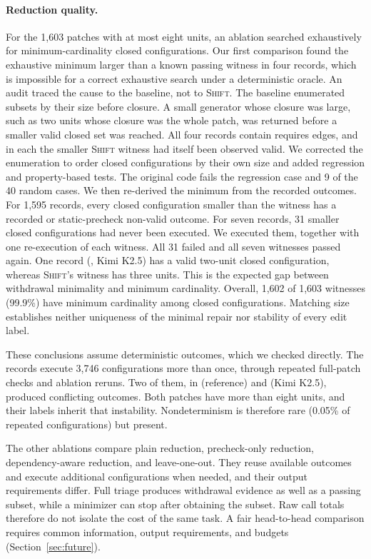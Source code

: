 \documentclass[a4paper,fleqn]{cas-sc}
\newcommand{\tool}{\textsc{Shift}}
\newcommand{\code}[1]{\texttt{\detokenize{#1}}}
\begin{document}
\paragraph{Reduction quality.}
For the 1,603 patches with at most eight units, an ablation searched exhaustively for minimum-cardinality closed configurations. Our first comparison found the exhaustive minimum larger than a known passing witness in four records, which is impossible for a correct exhaustive search under a deterministic oracle. An audit traced the cause to the baseline, not to \tool{}. The baseline enumerated subsets by their size before closure. A small generator whose closure was large, such as two units whose closure was the whole patch, was returned before a smaller valid closed set was reached. All four records contain requires edges, and in each the smaller \tool{} witness had itself been observed valid. We corrected the enumeration to order closed configurations by their own size and added regression and property-based tests. The original code fails the regression case and 9 of the 40 random cases. We then re-derived the minimum from the recorded outcomes. For 1,595 records, every closed configuration smaller than the witness has a recorded or static-precheck non-valid outcome. For seven records, 31 smaller closed configurations had never been executed. We executed them, together with one re-execution of each witness. All 31 failed and all seven witnesses passed again. One record (\code{sympy__sympy-19783}, Kimi K2.5) has a valid two-unit closed configuration, whereas \tool{}'s witness has three units. This is the expected gap between withdrawal minimality and minimum cardinality. Overall, 1,602 of 1,603 witnesses (99.9\%) have minimum cardinality among closed configurations. Matching size establishes neither uniqueness of the minimal repair nor stability of every edit label.

These conclusions assume deterministic outcomes, which we checked directly. The records execute 3,746 configurations more than once, through repeated full-patch checks and ablation reruns. Two of them, in \code{django__django-16263} (reference) and \code{sympy__sympy-13091} (Kimi K2.5), produced conflicting outcomes. Both patches have more than eight units, and their labels inherit that instability. Nondeterminism is therefore rare (0.05\% of repeated configurations) but present.

The other ablations compare plain reduction, precheck-only reduction, dependency-aware reduction, and leave-one-out. They reuse available outcomes and execute additional configurations when needed, and their output requirements differ. Full triage produces withdrawal evidence as well as a passing subset, while a minimizer can stop after obtaining the subset. Raw call totals therefore do not isolate the cost of the same task. A fair head-to-head comparison requires common information, output requirements, and budgets (Section~\ref{sec:future}).
\end{document}
